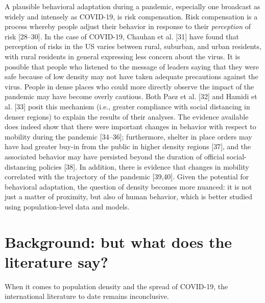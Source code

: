 \documentclass[10pt,letterpaper]{article}
\begin{document}
A plausible behavioral adaptation during a pandemic, especially one
broadcast as widely and intensely as COVID-19, is risk compensation.
Risk compensation is a process whereby people adjust their behavior in
response to their \emph{perception} of risk {[}28--30{]}. In the case of
COVID-19, Chauhan et al. {[}31{]} have found that perception of risks in
the US varies between rural, suburban, and urban residents, with rural
residents in general expressing less concern about the virus. It is
possible that people who listened to the message of leaders saying that
they were safe because of low density may not have taken adequate
precautions against the virus. People in dense places who could more
directly observe the impact of the pandemic may have become overly
cautious. Both Paez et al. {[}32{]} and Hamidi et al. {[}33{]} posit
this mechanism (i.e., greater compliance with social distancing in
denser regions) to explain the results of their analyses. The evidence
available does indeed show that there were important changes in behavior
with respect to mobility during the pandemic {[}34--36{]}; furthermore,
shelter in place orders may have had greater buy-in from the public in
higher density regions {[}37{]}, and the associated behavior may have
persisted beyond the duration of official social-distancing policies
{[}38{]}. In addition, there is evidence that changes in mobility
correlated with the trajectory of the pandemic {[}39,40{]}. Given the
potential for behavioral adaptation, the question of density becomes
more nuanced: it is not just a matter of proximity, but also of human
behavior, which is better studied using population-level data and
models.

\hypertarget{background-but-what-does-the-literature-say}{%
\section{Background: but what does the literature
say?}\label{background-but-what-does-the-literature-say}}

When it comes to population density and the spread of COVID-19, the
international literature to date remains inconclusive.
\end{document}
